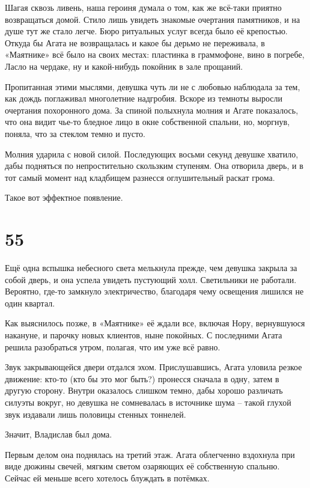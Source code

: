 \documentclass[
  a5paperpaper,
  DIV=11,
  numbers=noendperiod]{scrreprt}
\begin{document}
Шагая сквозь ливень, наша героиня думала о том, как же всё-таки приятно
возвращаться домой. Стило лишь увидеть знакомые очертания памятников, и
на душе тут же стало легче. Бюро ритуальных услуг всегда было её
крепостью. Откуда бы Агата не возвращалась и какое бы дерьмо не
переживала, в «Маятнике» всё было на своих местах: пластинка в
граммофоне, вино в погребе, Ласло на чердаке, ну и какой-нибудь покойник
в зале прощаний.

Пропитанная этими мыслями, девушка чуть ли не с любовью наблюдала за
тем, как дождь поглаживал многолетние надгробия. Вскоре из темноты
выросли очертания похоронного дома. За спиной полыхнула молния и Агате
показалось, что она видит чье-то бледное лицо в окне собственной
спальни, но, моргнув, поняла, что за стеклом темно и пусто.

Молния ударила с новой силой. Последующих восьми секунд девушке хватило,
дабы подняться по непростительно скользким ступеням. Она отворила дверь,
и в тот самый момент над кладбищем разнесся оглушительный раскат грома.

Такое вот эффектное появление.

\section*{55}\label{55}


Ещё одна вспышка небесного света мелькнула прежде, чем девушка закрыла
за собой дверь, и она успела увидеть пустующий холл. Светильники не
работали. Вероятно, где-то замкнуло электричество, благодаря чему
освещения лишился не один квартал.

Как выяснилось позже, в «Маятнике» её ждали все, включая Нору,
вернувшуюся накануне, и парочку новых клиентов, ныне покойных. С
последними Агата решила разобраться утром, полагая, что им уже всё
равно.

Звук закрывающейся двери отдался эхом. Прислушавшись, Агата уловила
резкое движение: кто-то (кто бы это мог быть?) пронесся сначала в одну,
затем в другую сторону. Внутри оказалось слишком темно, дабы хорошо
различать силуэты вокруг, но девушка не сомневалась в источнике шума --
такой глухой звук издавали лишь половицы стенных тоннелей.

Значит, Владислав был дома.

Первым делом она поднялась на третий этаж. Агата облегченно вздохнула
при виде дюжины свечей, мягким светом озаряющих её собственную спальню.
Сейчас ей меньше всего хотелось блуждать в потёмках.
\end{document}
